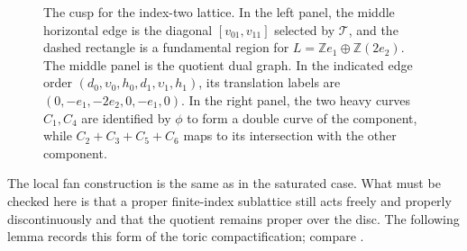 \documentclass[11pt]{article}
\theoremstyle{definition}
\theoremstyle{remark}
\numberwithin{equation}{section}
\newcommand{\dP}{\operatorname{dP}_6}
\begin{document}
\begin{figure}[tb]
\caption{The cusp for the index-two lattice.  In the left panel, the middle
horizontal edge is the diagonal $[v_{01},v_{11}]$ selected by
$\mathcal T$, and the dashed
rectangle is a fundamental region for
$L=\mathbb Ze_1\oplus\mathbb Z(2e_2)$.  The middle panel is the quotient
dual graph.  In the indicated edge order
$(d_0,\upsilon_0,h_0,d_1,\upsilon_1,h_1)$, its translation labels are
$(0,-e_1,-2e_2,0,-e_1,0)$.  In the right panel, the two heavy curves
$C_1,C_4$ are identified by $\phi$ to form a double curve of the
component, while $C_2+C_3+C_5+C_6$ maps to its intersection with the other
component.}
\label{fig:cusp-combinatorics}
\end{figure}
\FloatBarrier

The local fan construction is the same as in the saturated case.  What must
be checked here is that a proper finite-index sublattice still acts freely
and properly discontinuously and that the quotient remains proper over the
disc.  The following lemma records this form of the toric compactification;
compare \citep[Theorem~4.5]{Alpoge2026}.
\end{document}
